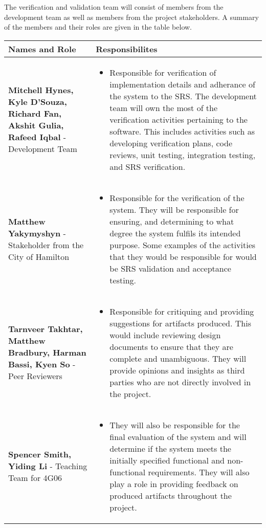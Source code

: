 \documentclass[12pt, titlepage]{article}
\begin{document}
The verification and validation team will consist of members from the
development team as well as members from the project stakeholders. A summary of
the members and their roles are given in the table below.
\setlength{\arrayrulewidth}{0.5mm}
\setlength{\tabcolsep}{18pt}
\renewcommand{\arraystretch}{1.5}\\
\begin{tabular}{ | m{5cm} | m{9cm} | }
  \hline
  \textbf{Names and Role} & \textbf{Responsibilites} \\
  \hline
  \textbf{Mitchell Hynes, Kyle D'Souza, Richard Fan, Akshit Gulia, Rafeed
  Iqbal} - Development Team &
  \begin{itemize}
    \item Responsible for verification of implementation details and
      adherance of the system to the SRS. The development team will own the
      most of the verification activities pertaining to the software. This
      includes activities such as developing verification plans, code reviews,
      unit testing, integration testing, and SRS verification.

  \end{itemize}\\
  \hline
  \textbf{Matthew Yakymyshyn} - Stakeholder from the City of Hamilton &
  \begin{itemize}
    \item Responsible for the verification of the system. They will be
      responsible for ensuring, and determining to what degree the
      system fulfils its intended purpose.
      Some examples of the activities that they would be responsible for
      would be SRS validation and acceptance testing.

  \end{itemize}\\
  \hline
  \textbf{Tarnveer Takhtar, Matthew Bradbury, Harman Bassi, Kyen So}
  - Peer Reviewers &
  \begin{itemize}
    \item Responsible for critiquing and providing suggestions for artifacts
      produced. This would include reviewing design documents to ensure that
      they are complete and unambiguous. They will provide opinions and
      insights as third parties who are not directly involved in the project.
  \end{itemize}\\
  \hline
  \textbf{Spencer Smith, Yiding Li} - Teaching Team for 4G06 &
  \begin{itemize}
    \item They will also be responsible for the final
      evaluation of the system and will determine if the system meets the
      initially specified functional and non-functional requirements.
      They will also play a role in providing feedback on produced artifacts
      throughout the project.
  \end{itemize}\\
  \hline

\end{tabular}
\end{document}
